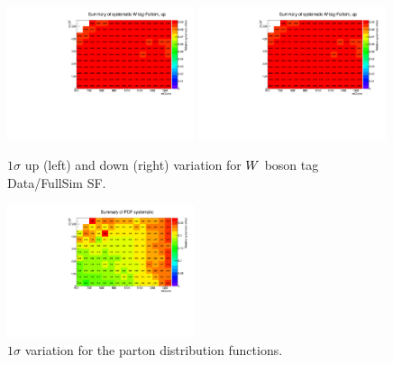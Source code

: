 \begin{figure}[htpb]
\includegraphics[width=0.49\textwidth]{figures/app_sig_syst/sys_W-tag-Fullsim_up}
\includegraphics[width=0.49\textwidth]{figures/app_sig_syst/sys_W-tag-Fullsim_up}
\caption{$1\sigma$ up (left) and down (right) variation for $W$ boson tag Data/FullSim SF.}
\end{figure}

\begin{figure}[htpb]
\centering
\includegraphics[width=0.49\textwidth]{figures/app_sig_syst/sys_PDF}
\caption{$1\sigma$ variation for the parton distribution functions. \label{fig:sig_sys_end}}
\end{figure}

